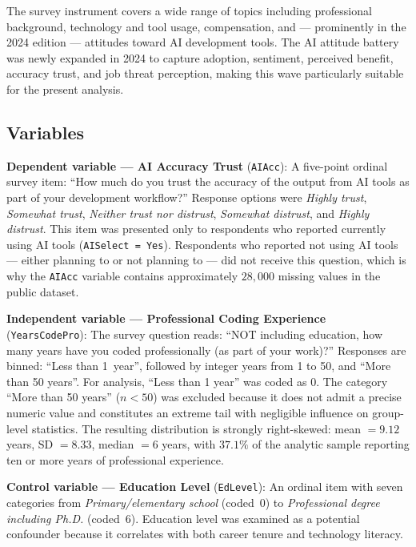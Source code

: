 \documentclass[11pt,a4paper]{article}
\begin{document}
The survey instrument covers a wide range of topics including professional background,
technology and tool usage, compensation, and --- prominently in the 2024 edition ---
attitudes toward AI development tools. The AI attitude battery was newly expanded in 2024
to capture adoption, sentiment, perceived benefit, accuracy trust, and job threat perception,
making this wave particularly suitable for the present analysis.

\subsection{Variables}

\textbf{Dependent variable --- AI Accuracy Trust} (\texttt{AIAcc}): A five-point
ordinal survey item: ``How much do you trust the accuracy of the output from AI tools
as part of your development workflow?'' Response options were \emph{Highly trust},
\emph{Somewhat trust}, \emph{Neither trust nor distrust}, \emph{Somewhat distrust},
and \emph{Highly distrust}. This item was presented only to respondents who reported
currently using AI tools (\texttt{AISelect = Yes}). Respondents who reported not using
AI tools --- either planning to or not planning to --- did not receive this question,
which is why the \texttt{AIAcc} variable contains approximately $28{,}000$ missing values
in the public dataset.

\textbf{Independent variable --- Professional Coding Experience} (\texttt{YearsCodePro}):
The survey question reads: ``NOT including education, how many years have you coded
professionally (as part of your work)?'' Responses are binned: ``Less than 1~year'',
followed by integer years from 1 to 50, and ``More than 50 years''. For analysis,
``Less than 1 year'' was coded as $0$. The category ``More than 50 years'' ($n < 50$)
was excluded because it does not admit a precise numeric value and constitutes an extreme
tail with negligible influence on group-level statistics. The resulting distribution is
strongly right-skewed: mean $= 9.12$ years, SD $= 8.33$, median $= 6$ years, with
$37.1\%$ of the analytic sample reporting ten or more years of professional experience.

\textbf{Control variable --- Education Level} (\texttt{EdLevel}): An ordinal item with
seven categories from \emph{Primary/elementary school} (coded~0) to \emph{Professional
degree including Ph.D.} (coded~6). Education level was examined as a potential confounder
because it correlates with both career tenure and technology literacy.
\end{document}
